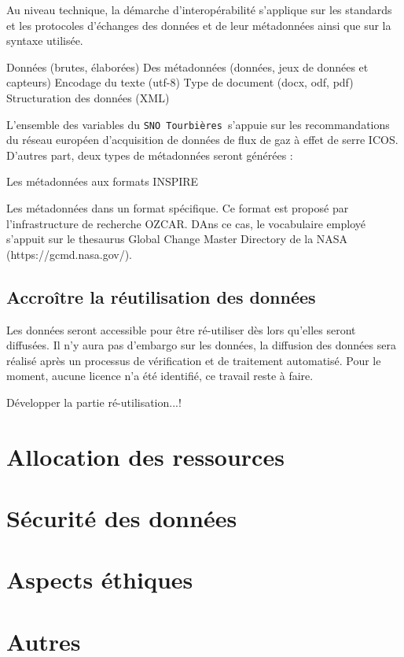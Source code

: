 \documentclass[]{article}
\newcommand{\SNOT}{{\tt SNO~Tourbières }}
\begin{document}
Au niveau technique, la démarche d'interopérabilité s'applique sur les standards et les protocoles d'échanges des données et de leur métadonnées ainsi que sur la syntaxe utilisée.


Données (brutes, élaborées)
Des métadonnées (données, jeux de données et capteurs)
Encodage du texte (utf-8)
Type de document (docx, odf, pdf)
Structuration des données (XML)



L'ensemble des variables du \SNOT s'appuie sur les recommandations du réseau européen d'acquisition de données de flux de gaz à effet de serre ICOS. D'autres part, deux types de métadonnées seront générées :
	
Les métadonnées aux formats INSPIRE
	
Les métadonnées dans un format spécifique. Ce format est proposé par l'infrastructure de recherche OZCAR. DAns ce cas, le vocabulaire employé s'appuit sur le thesaurus Global Change Master Directory de la NASA (https://gcmd.nasa.gov/).
	
\subsection{Accroître la réutilisation des données}
	
Les données seront accessible pour être ré-utiliser dès lors qu'elles seront diffusées. Il n'y aura pas d'embargo sur les données, la diffusion des données sera réalisé après un processus de vérification et de traitement automatisé. Pour le moment, aucune licence n'a été identifié, ce travail reste à faire.
	
Développer la partie ré-utilisation...!
	
\section{Allocation des ressources}
	
\section{Sécurité des données}
	
\section{Aspects éthiques}
	
\section{Autres}
	
	
\end{document}
